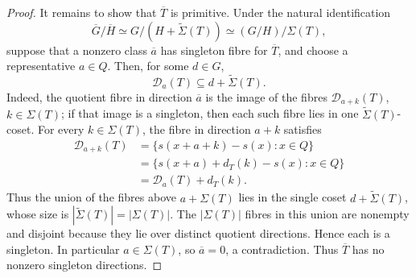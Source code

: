 \documentclass[10pt,a4paper]{amsart}
\begin{document}
\begin{proof}
It remains to show that $\overline T$ is primitive.  Under the natural
identification
\[
  \overline G/\overline H
  \simeq
  G/(H+\widetilde\Sigma(T))
  \simeq
  (G/H)/\Sigma(T),
\]
suppose that a nonzero class $\overline a$ has singleton fibre for
$\overline T$, and choose a representative $a\in Q$.  Then, for some $d\in G$,
\[
  \mathcal D_a(T)\subseteq d+\widetilde\Sigma(T).
\]
Indeed, the quotient fibre in direction \(\overline a\) is the image of the
fibres \(\mathcal D_{a+k}(T)\), \(k\in\Sigma(T)\); if that image is a singleton,
then each such fibre lies in one \(\widetilde\Sigma(T)\)-coset.
For every $k\in\Sigma(T)$, the fibre in direction $a+k$ satisfies
\[
\begin{aligned}
  \mathcal D_{a+k}(T)
  &=\{s(x+a+k)-s(x):x\in Q\} \\
  &=\{s(x+a)+d_T(k)-s(x):x\in Q\} \\
  &=\mathcal D_a(T)+d_T(k).
\end{aligned}
\]
Thus the union of the fibres above $a+\Sigma(T)$ lies in the single coset
$d+\widetilde\Sigma(T)$, whose size is
$|\widetilde\Sigma(T)|=|\Sigma(T)|$.  The $|\Sigma(T)|$ fibres in this union are
nonempty and disjoint because they lie over distinct quotient directions.
Hence each is a singleton.  In particular $a\in\Sigma(T)$, so
$\overline a=0$, a contradiction.  Thus $\overline T$ has no nonzero singleton
directions.
\end{proof}
\end{document}

